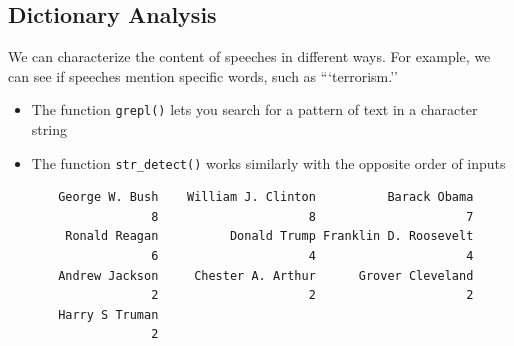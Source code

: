 \documentclass[
  letterpaper,
  DIV=11,
  numbers=noendperiod]{scrreprt}
\newenvironment{Shaded}{\begin{snugshade}}{\end{snugshade}}
\newcommand{\AttributeTok}[1]{\textcolor[rgb]{0.40,0.45,0.13}{#1}}
\newcommand{\DecValTok}[1]{\textcolor[rgb]{0.68,0.00,0.00}{#1}}
\newcommand{\FunctionTok}[1]{\textcolor[rgb]{0.28,0.35,0.67}{#1}}
\newcommand{\NormalTok}[1]{\textcolor[rgb]{0.00,0.23,0.31}{#1}}
\newcommand{\OtherTok}[1]{\textcolor[rgb]{0.00,0.23,0.31}{#1}}
\newcommand{\SpecialCharTok}[1]{\textcolor[rgb]{0.37,0.37,0.37}{#1}}
\newcommand{\StringTok}[1]{\textcolor[rgb]{0.13,0.47,0.30}{#1}}
\providecommand{\tightlist}{%
  \setlength{\itemsep}{0pt}\setlength{\parskip}{0pt}}\usepackage{longtable,booktabs,array}
\begin{document}
\hypertarget{dictionary-analysis}{%
\subsection{Dictionary Analysis}\label{dictionary-analysis}}

We can characterize the content of speeches in different ways. For
example, we can see if speeches mention specific words, such as
```terrorism.''

\begin{itemize}
\tightlist
\item
  The function \texttt{grepl()} lets you search for a pattern of text in
  a character string
\item
  The function \texttt{str\_detect()} works similarly with the opposite
  order of inputs
\end{itemize}

\begin{Shaded}
\end{Shaded}

\begin{Shaded}
\end{Shaded}

\begin{verbatim}
       George W. Bush    William J. Clinton          Barack Obama 
                    8                     8                     7 
        Ronald Reagan          Donald Trump Franklin D. Roosevelt 
                    6                     4                     4 
       Andrew Jackson     Chester A. Arthur      Grover Cleveland 
                    2                     2                     2 
       Harry S Truman 
                    2 
\end{verbatim}
\end{document}
